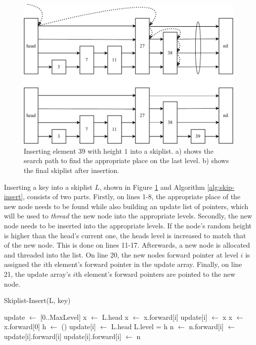 \begin{figure}[!htb]
    \centering
    \includegraphics[width=.9\textwidth]{images/skip-search-insert.pdf}
    \caption{Inserting element $39$ with height $1$ into a skiplist. a) shows the search path to find the appropriate place on the last level. b) shows the final skiplist after insertion.}
    \label{fig:skip-search-insert}
\end{figure}

Inserting a key into a skiplist $L$, shown in Figure \ref{fig:skip-search-insert} and Algorithm \ref{alg:skip-insert}, consists of two parts. Firstly, on lines 1-8, the appropriate place of the new node needs to be found while also building an update list of pointers, which will be used to \textit{thread} the new node into the appropriate levels. Secondly, the new node needs to be inserted into the appropriate levels. If the node's random height is higher than the head's current one, the heads level is increased to match that of the new node. This is done on lines 11-17. Afterwards, a new node is allocated and threaded into the list. On line 20, the new nodes forward pointer at level $i$ is assigned the $i$th element's forward pointer in the update array. Finally, on line 21, the update array's $i$th element's forward pointers are pointed to the new node. 

\begin{algorithm}[!htb]
\caption{Skiplist-Insert(L, key)}
\label{alg:skip-insert}
\begin{algorithmic}[1]
    \State update $\gets$ [0..MaxLevel]
    \State x $\gets$ L.head
            \State x $\gets$ x.forward[i]
        \EndWhile
        \State update[i] $\gets$ x
    \EndFor
    \State x $\gets$ x.forward[0]
        \State h $\gets$ ()
                \State update[i] $\gets$ L.head
            \EndFor
            \State L.level = h
        \EndIf
        \State n $\gets$ 
            \State n.forward[i] $\gets$ update[i].forward[i]
            \State update[i].forward[i] $\gets$ n
        \EndFor
    \EndIf
\end{algorithmic}
\end{algorithm}

